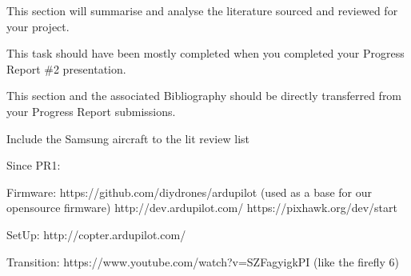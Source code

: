 \color{red}
This section will summarise and analyse the literature sourced and reviewed for your project.

This task should have been mostly completed when you completed your Progress Report \#2 presentation.

This section and the associated Bibliography should be directly transferred from your Progress Report submissions.

Include the Samsung aircraft to the lit review list

Since PR1:

Firmware:
https://github.com/diydrones/ardupilot (used as a base for our opensource firmware)
http://dev.ardupilot.com/
https://pixhawk.org/dev/start

SetUp:
http://copter.ardupilot.com/

Transition:
https://www.youtube.com/watch?v=SZFagyigkPI (like the firefly 6)


\color{black}